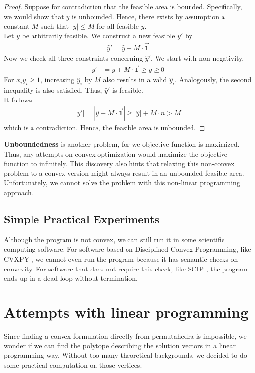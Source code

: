 \documentclass[12pt,letterpaper]{article}
\begin{document}
\begin{proof}
    Suppose for contradiction that the feasible area is bounded.
    Specifically, we would show that $y$ is unbounded. Hence, 
    there exists by assumption a constant $M$ such that $|y| \leq M$ for all 
    feasible $y$. \\ 
    Let $\hat{y}$ be arbitrarily feasible. We construct a new feasible $\hat{y}'$ by 
    \begin{align*}
        \hat{y}' = \hat{y} + M \cdot \vec{\mathbf{1}}
    \end{align*} 
    Now we check all three constraints concerning $\hat{y}'$.
    We start with non-negativity.
    \begin{align*}
        \hat{y}' &= \hat{y} + M \cdot \vec{\mathbf{1}} \geq \hat{y} \geq 0
    \end{align*}
    For $x_iy_i \geq 1$, increasing $\hat{y}_i$ by $M$ also results in a valid $\hat{y}_i$.
    Analogously, the second inequality is also satisfied. Thus, $\hat{y}'$ is feasible. \\
    It follows 
    \begin{align*}
        |\hat{y}'| = |\hat{y} + M \cdot \vec{\mathbf{1}}| \geq |\hat{y}| + M \cdot n > M
    \end{align*}
    which is a contradiction. Hence, the feasible area is unbounded.
\end{proof}

\textbf{Unboundedness} is another problem, for we objective function is maximized. 
Thus, any attempts on convex optimization would maximize the objective function to infinitely.
This discovery also hints that relaxing this non-convex problem 
to a convex version might always result in an unbounded feasible area.
Unfortunately, we cannot solve the problem with this non-linear programming approach. 

\subsection{Simple Practical Experiments}
Although the program is not convex, we can still run it in some scientific computing software.
For software based on Disciplined Convex Programming, like CVXPY \cite{diamond2016cvxpy}, we cannot even run the program 
because it has semantic checks on convexity. For software that does not require this check, like SCIP \cite{BolusaniEtal2024ZR}, the program 
ends up in a dead loop without termination. 

\section{Attempts with linear programming}
Since finding a convex formulation directly from permutahedra is impossible, 
we wonder if we can find the polytope describing the solution vectors in a linear programming way.
Without too many theoretical backgrounds, 
we decided to do some practical computation on those vertices.
\end{document}
